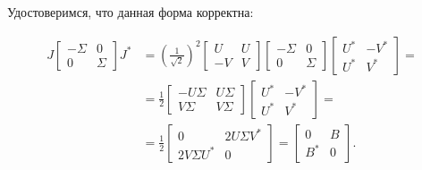 Удостоверимся, что данная форма корректна:

\begin{equation*}
    \begin{split}
        J \begin{bmatrix} -\Sigma & 0 \\ 0 & \Sigma \end{bmatrix} J^* 
        &= \left( \frac{1}{\sqrt{2}}\right)^2 
            \begin{bmatrix} U & U \\ -V & V \end{bmatrix}
            \begin{bmatrix} -\Sigma & 0 \\ 0 & \Sigma \end{bmatrix}
            \begin{bmatrix} U^* & -V^* \\ U^* & V^* \end{bmatrix}= \\[6pt]
        &= \frac{1}{2} 
            \begin{bmatrix} -U\Sigma & U\Sigma \\ V\Sigma & V\Sigma \end{bmatrix}
            \begin{bmatrix} U^* & -V^* \\ U^* & V^* \end{bmatrix}=\\[6pt] 
        &= \frac{1}{2} 
            \begin{bmatrix} 0 & 2 U\Sigma V^* \\ 2 V\Sigma U^* & 0 \end{bmatrix} = \begin{bmatrix} 0 & B \\ B^* & 0 \end{bmatrix}.
    \end{split}
\end{equation*}

